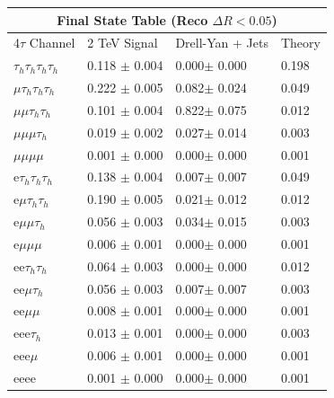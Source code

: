 \documentclass{article}
\begin{document}
 
\begin{landscape} 
\centering 
\begin{tabular}{|p{4.5cm}|p{3cm}|p{3cm}|p{3cm}|}\hline 
\multicolumn{4}{|c|}{Final State Table (Reco \(\Delta R < 0.05\))} \\ 
\hline 
4$\tau$ Channel & 2 TeV Signal & Drell-Yan + Jets & Theory \\ 
\hline 
$\tau_h$$\tau_h$$\tau_h$$\tau_h$ & 0.118 $\pm$ 0.004 & 0.000$\pm$ 0.000 & 0.198\\
\hline 
$\mu$$\tau_h$$\tau_h$$\tau_h$ & 0.222 $\pm$ 0.005 & 0.082$\pm$ 0.024 & 0.049\\
\hline 
$\mu$$\mu$$\tau_h$$\tau_h$ & 0.101 $\pm$ 0.004 & 0.822$\pm$ 0.075 & 0.012\\
\hline 
$\mu$$\mu$$\mu$$\tau_h$ & 0.019 $\pm$ 0.002 & 0.027$\pm$ 0.014 & 0.003\\
\hline 
$\mu$$\mu$$\mu$$\mu$ & 0.001 $\pm$ 0.000 & 0.000$\pm$ 0.000 & 0.001\\
\hline 
e$\tau_h$$\tau_h$$\tau_h$ & 0.138 $\pm$ 0.004 & 0.007$\pm$ 0.007 & 0.049\\
\hline 
e$\mu$$\tau_h$$\tau_h$ & 0.190 $\pm$ 0.005 & 0.021$\pm$ 0.012 & 0.012\\
\hline 
e$\mu$$\mu$$\tau_h$ & 0.056 $\pm$ 0.003 & 0.034$\pm$ 0.015 & 0.003\\
\hline 
e$\mu$$\mu$$\mu$ & 0.006 $\pm$ 0.001 & 0.000$\pm$ 0.000 & 0.001\\
\hline 
ee$\tau_h$$\tau_h$ & 0.064 $\pm$ 0.003 & 0.000$\pm$ 0.000 & 0.012\\
\hline 
ee$\mu$$\tau_h$ & 0.056 $\pm$ 0.003 & 0.007$\pm$ 0.007 & 0.003\\
\hline 
ee$\mu$$\mu$ & 0.008 $\pm$ 0.001 & 0.000$\pm$ 0.000 & 0.001\\
\hline 
eee$\tau_h$ & 0.013 $\pm$ 0.001 & 0.000$\pm$ 0.000 & 0.003\\
\hline 
eee$\mu$ & 0.006 $\pm$ 0.001 & 0.000$\pm$ 0.000 & 0.001\\
\hline 
eeee & 0.001 $\pm$ 0.000 & 0.000$\pm$ 0.000 & 0.001\\
\hline 
\end{tabular} 
\end{landscape} 
\end{document}
